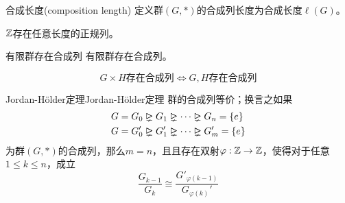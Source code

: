 \begin{definition}{合成长度(composition length)}
	定义群$(G,*)$的合成列长度为合成长度$\ell(G)$。
\end{definition}

\begin{problem}
	$\mathbb{Z}$存在任意长度的正规列。
\end{problem}

\begin{proposition}{有限群存在合成列}
	有限群存在合成列。
\end{proposition}

\begin{proposition}
	$$
	G\times H\text{存在合成列}\iff G,H\text{存在合成列}
	$$
\end{proposition}

\begin{theorem}{Jordan-Hölder定理}{Jordan-Hölder定理}
	群的合成列等价；换言之如果
	\begin{align*}
		&G=G_0\rhdneq  G_1 \rhdneq  \cdots \rhdneq   G_n=\{e\}\\
		&G=G_0'\rhdneq  G_1' \rhdneq  \cdots \rhdneq   G_m'=\{e\}
	\end{align*}
	为群$(G,*)$的合成列，那么$m=n$，且且存在双射$\varphi:\mathbb{Z}\to\mathbb{Z}$，使得对于任意$1\le k\le n$，成立
	$$
	\frac{G_{k-1}}{G_{k}}\cong\frac{G'_{\varphi(k-1)}}{G_{\varphi(k)}'}
	$$
\end{theorem}

